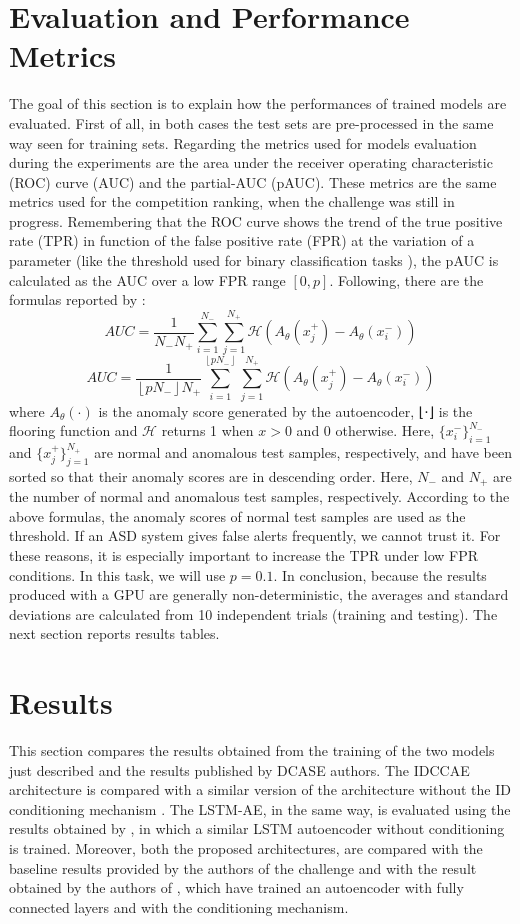 \section{Evaluation and Performance Metrics}
The goal of this section is to explain how the performances of trained models are evaluated. First of all, in both cases the test sets are pre-processed in the same way seen for training sets. Regarding the metrics used for models evaluation during the experiments are the area under the receiver operating characteristic (ROC) curve (AUC) and the partial-AUC (pAUC). These metrics are the same metrics used for the competition ranking, when the challenge was still in progress. Remembering that the ROC curve shows the trend of the true positive rate (TPR) in function of the false positive rate (FPR) at the variation of a parameter (like the threshold used for binary classification tasks
), the pAUC is calculated as the AUC over a low FPR range $[0,p]$. Following, there are the formulas reported by \cite{DCASE}:
\[ AUC =\frac{1}{N_-N_+}\sum_{i=1}^{N_-}\sum_{j=1}^{N_+}\mathcal{H}(A_\theta(x_j^+)-A_\theta(x_i^-)) \]
\[AUC =\frac{1}{ \left \lfloor pN_- \right \rfloor N_+}\sum_{i=1}^{ \left \lfloor pN_- \right \rfloor }\sum_{j=1}^{N_+}\mathcal{H}(A_\theta(x_j^+)-A_\theta(x_i^-))\]
where $A_\theta(\cdot)$ is the anomaly score generated by the autoencoder, ⌊⋅⌋ is the flooring function and $\mathcal{H}$ returns 1 when $x>0$ and $0$ otherwise. Here, $\{x^−_i\}^{N_-}_{i=1}$
and $\{x^+_j\}^{N_+}_{j=1}$ are normal and anomalous test samples, respectively, and have been sorted so that their anomaly scores are in descending order. Here, $N_−$ and $N_+$
are the number of normal and anomalous test samples, respectively. According to the above formulas, the anomaly scores of normal test samples are used as the threshold. If an ASD system gives false alerts frequently, we cannot trust it. For these reasons, it is especially important to increase the TPR under low FPR conditions. In this task, we will use $p=0.1$. In conclusion, because the results produced with a GPU are generally non-deterministic, the averages and standard deviations are calculated from 10 independent trials (training and testing). The next section reports results tables.

\section{Results}
This section compares the results obtained from the training of the two models just described and the results published by DCASE authors. The IDCCAE architecture is compared with a similar version of the architecture without the ID conditioning mechanism \cite{15DeepDenseConvAE}. The LSTM-AE, in the same way, is evaluated using the results obtained by \cite{16LSTMDeepAutoencodersForASDtask}, in which a similar LSTM autoencoder without conditioning is trained. 
Moreover, both the proposed architectures, are compared with the baseline results provided by the authors of the challenge and with the result obtained by the authors of \cite{18IDConditionedAutoEncoder}, which have trained an autoencoder with fully connected layers and with the conditioning mechanism.

